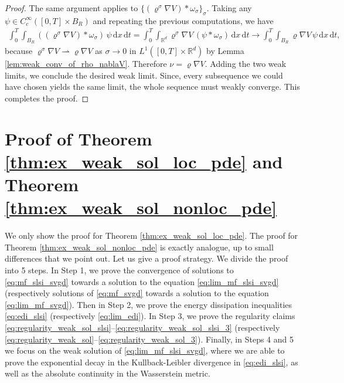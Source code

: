 \documentclass[reqno, 11pt]{amsart}
\numberwithin{equation}{section}
\theoremstyle{definition}
\begin{document}
\begin{proof}
    \smallskip
    
    The same argument applies to $\{(\varrho^\sigma
    \nabla V)\ast\omega_\sigma\}_\sigma$. Taking any $\psi\in C_c^\infty([0,T]\times B_R)$ and repeating the previous computations, we have
    \begin{align*}
        \int_0^T\int_{B_R} ((\varrho^\sigma
        \nabla V)\ast\omega_\sigma)\,\psi\,\mathrm{d} x\,\mathrm{d} t
        = \int_0^T\int_{\mathbb{R}^{d}} \varrho^\sigma
        \nabla V\, (\psi\ast\omega_\sigma)\,\mathrm{d} x\,\mathrm{d} t
        \rightarrow \int_0^T\int_{B_R} \varrho\nabla V\,\psi \,\mathrm{d} x\,\mathrm{d} t,
    \end{align*}
    because $\varrho^\sigma
    \nabla V \rightharpoonup \varrho
    \nabla V$ as $\sigma\rightarrow 0$ in $L^1([0,T]\times \mathbb{R}^{d})$ by Lemma \ref{lem:weak_conv_of_rho_nablaV}. Therefore $\nu=\varrho\nabla V$. Adding the two weak limits, we conclude the desired weak limit. Since, every subsequence we could have chosen yields the same limit, the whole sequence must weakly converge. This completes the proof.
\end{proof}


\section{Proof of Theorem \ref{thm:ex_weak_sol_loc_pde} and Theorem \ref{thm:ex_weak_sol_nonloc_pde}}

\label{sec:main_proof}

We only show the proof for Theorem \ref{thm:ex_weak_sol_loc_pde}. The proof for Theorem \ref{thm:ex_weak_sol_nonloc_pde} is exactly analogue, up to small differences that we point out. Let us give a proof strategy. We divide the proof into 5 steps. In Step 1, we prove the convergence of solutions to \eqref{eq:mf_slsi_svgd} towards a solution to the equation \eqref{eq:lim_mf_slsi_svgd} (respectively solutions of \eqref{eq:mf_svgd} towards a solution to the equation \eqref{eq:lim_mf_svgd}). Then in Step 2, we prove the energy dissipation inequalities \eqref{eq:edi_slsi} (respectively \eqref{eq:lim_edi}). In Step 3, we prove the regularity claims \eqref{eq:regularity_weak_sol_slsi}--\eqref{eq:regularity_weak_sol_slsi_3} (respectively \eqref{eq:regularity_weak_sol}--\eqref{eq:regularity_weak_sol_3}). Finally, in Steps 4 and 5 we focus on the weak solution of \eqref{eq:lim_mf_slsi_svgd}, where we are able to prove the exponential decay in the Kullback-Leibler divergence in \eqref{eq:edi_slsi}, as well as the absolute continuity in the Wasserstein metric.
\end{document}
